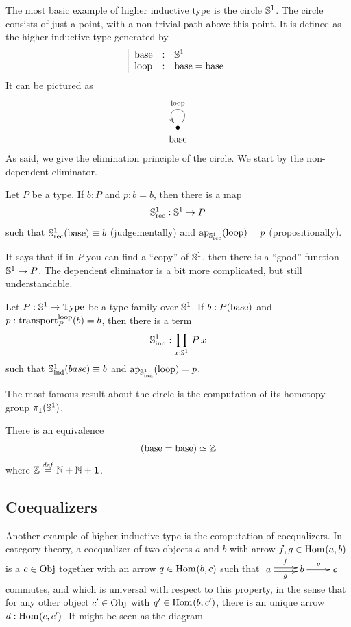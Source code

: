 The most basic example of higher inductive type is the circle
$\mathbb{S}^1$. The circle consists of just a point, with a non-trivial
path above this point. It is defined as the higher inductive type
generated by
\[ \left| 
    \begin{array}{lll}
      \mathrm{base} & : & \mathbb{S}^1 \\
      \mathrm{loop} & : & \mathrm{base} = \mathrm{base}
    \end{array}
    \right.
\]
It can be pictured as
\[
  \xymatrix@R=0.1em{ \bullet \ar@(ur,ul)[]_\loopS \\ \baseS}
\]
As said, we give the elimination principle of the circle. We start by
the non-dependent eliminator.
\begin{lem}\label{lem:S1_rec}
  Let $P$ be a type. If $b:P$ and $p:b = b$, then there is a map
  \[\mathbb{S}^1_{\mathrm{rec}} : \mathbb{S}^1 \to P \]
  such that $\mathbb{S}^1_{\mathrm{rec}}(\mathrm{base}) \equiv b$ (judgementally) and
  $\mathrm{ap}_{\mathbb{S}^1_{\mathrm{rec}}}(\mathrm{loop}) = p$ (propositionally).
\end{lem}
It says that if in $P$ you can find a ``copy'' of $\mathbb{S}^1$, then there
is a ``good'' function $\mathbb{S}^1 \to P$.
The dependent eliminator is a bit more complicated, but still
understandable.
\begin{lem}\label{lem:S1_ind}
  Let $P:\mathbb{S}^1\to\operatorname{Type}$ be a type family over $\mathbb{S}^1$. If
  $b:P(\mathrm{base})$ and $p:\operatorname{transport}_P^{\mathrm{loop}}(b) = b$, then there is a term
  \[ \mathbb{S}^1_{\mathrm{ind}} : \prod_{x:\mathbb{S}^1}\, P\, x\]
  such that $\mathbb{S}^1_{\mathrm{ind}}(base) \equiv b$ and
  $\mathrm{ap}_{\mathbb{S}^1_{\mathrm{ind}}}(\mathrm{loop}) = p$.
\end{lem}
The most famous result about the circle is the computation of its
homotopy group $\pi_1(\mathbb{S}^1)$.

\begin{prop}
  There is an equivalence
  \[ (\mathrm{base} = \mathrm{base}) \simeq \mathbb{Z} \]
  where $\mathbb{Z} \overset{de\hspace{-0.2ex}f}{=} \mathbb{N}+\mathbb{N}+\mathbf{1}$.
\end{prop}

\subsection{Coequalizers}
\label{ssec:coeq}

Another example of higher inductive type is the computation of
coequalizers. In category theory, a coequalizer of two objects $a$ and
$b$ with arrow $f,g\in\mathrm{Hom}_{}(a,b)$ is a $c\in\mathrm{Obj}$ together with an arrow
$q\in\mathrm{Hom}_{}(b,c)$ such that $\xymatrix{
    a \ar@<2pt>[r]^f \ar@<-2pt>[r]_g& b \ar[r]^q & c}$ commutes, and which is universal with respect to this property, in
the sense that for any other object $c'\in\mathrm{Obj}$ with
$q'\in\mathrm{Hom}_{}(b,c')$, there is an unique arrow $d:\mathrm{Hom}_{}(c,c')$. It
might be seen as the diagram

